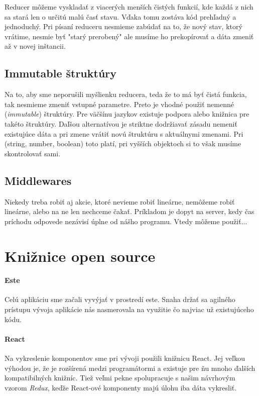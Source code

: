 Reducer môžeme vyskladať z viacerých menších čistých funkcií, kde každá z nich sa stará len o určitú malú časť stavu. Vďaka tomu zostáva kód prehľadný a jednoduchý.%
Pri písaní reduceru nesmieme zabúdať na to, že nový stav, ktorý vrátime, nesmie byť "starý prerobený" ale musíme ho prekopírovať a dáta zmeniť až v novej inštancii.

\subsection{Immutable štruktúry}
Na to, aby sme neporušili myšlienku reducera, teda že to má byť čistá funkcia, tak nesmieme zmeniť vstupné parametre. Preto je vhodné použiť nemenné (\emph{immutable}) štruktúry. Pre väčšínu jazykov existuje podpora alebo knižnica pre takéto štruktúry. Daľšou alternatívou je striktne dodržiavať zásadu nemeniť existujúce dáta a pri zmene vrátiť novú štruktúru s aktuálnymi zmenami. Pri (string, number, boolean) %
toto platí, pri vyšších objektoch si to však musíme skontrolovať sami.

\subsection{Middlewares}
Niekedy treba robiť aj akcie, ktoré nevieme robiť lineárne, nemôžeme robiť lineárne, alebo na ne len nechceme čakať. Príkladom je dopyt na server, kedy čas príchodu odpovede nezávisí úplne od nášho programu. Vtedy môžeme použiť...%
\TODO



\section{Knižnice open source}%

\paragraph{Este}
Celú aplikáciu sme začali vyvýjať v prostredí este. Snaha držať sa agilného prístupu vývoja aplikácie nás nasmerovala na využitie čo najviac už existujúceho kódu. %

 \cite[Este starter kit]{Este}

\paragraph{React}
Na vykreslenie komponentov sme pri vývoji použili knižnicu React. Jej veľkou výhodou je, že je rozšírená medzi programátormi a existuje pre ňu mnoho ďalších kompatibilných knižníc. Tiež veľmi pekne spolupracuje s našim návrhovým vzorom \emph{Redux}, keďže React-ové komponenty majú úlohu iba dáta vykresliť.

